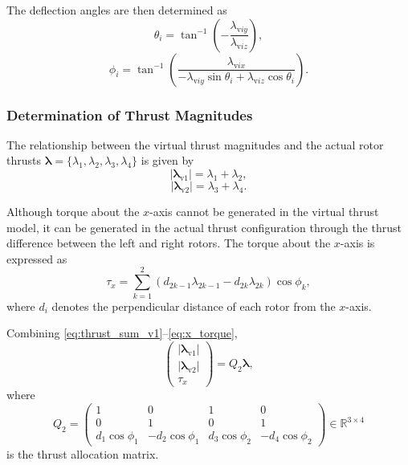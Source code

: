 \documentclass{WileyMSP-template}
\begin{document}
The deflection angles are then determined as
\begin{equation}
  \theta_i = \tan^{-1}\!\left( -\frac{\lambda_{\mathrm{v}iy}}{\lambda_{\mathrm{v}iz}} \right),
\end{equation}
\begin{equation}
  \phi_i = \tan^{-1}\!\left(
  \frac{\lambda_{\mathrm{v}ix}}
  {-\lambda_{\mathrm{v}iy}\sin\theta_i + \lambda_{\mathrm{v}iz}\cos\theta_i}
  \right).
\end{equation}

\subsubsection{Determination of Thrust Magnitudes}

The relationship between the virtual thrust magnitudes and the actual rotor thrusts $\bm{\lambda} = \{\lambda_1, \lambda_2, \lambda_3, \lambda_4\}$ is given by
\begin{equation}\label{eq:thrust_sum_v1}
  \lvert \bm{\lambda}_{\mathrm{v}1} \rvert = \lambda_1 + \lambda_2,
\end{equation}
\begin{equation}\label{eq:thrust_sum_v2}
  \lvert \bm{\lambda}_{\mathrm{v}2} \rvert = \lambda_3 + \lambda_4.
\end{equation}

Although torque about the $x$-axis cannot be generated in the virtual thrust model, it can be generated in the actual thrust configuration through the thrust difference between the left and right rotors. 
The torque about the $x$-axis is expressed as
\begin{equation}\label{eq:x_torque}
  \tau_x
  =
  \sum_{k=1}^{2}
  \left(
  d_{2k-1}\lambda_{2k-1}
  -
  d_{2k}\lambda_{2k}
  \right)
  \cos\phi_k,
\end{equation}
where $d_i$ denotes the perpendicular distance of each rotor from the $x$-axis.

Combining \eqref{eq:thrust_sum_v1}–\eqref{eq:x_torque},
\begin{equation}
  \begin{pmatrix}
  \lvert \bm{\lambda}_{\mathrm{v}1} \rvert \\
  \lvert \bm{\lambda}_{\mathrm{v}2} \rvert \\
  \tau_x
  \end{pmatrix}
  =
  Q_2 \bm{\lambda},
\end{equation}
where
\begin{equation}
  Q_2 =
  \begin{pmatrix}
  1 & 0 & 1 & 0 \\
  0 & 1 & 0 & 1 \\
  d_1\cos\phi_1 & -d_2\cos\phi_1 & d_3\cos\phi_2 & -d_4\cos\phi_2
  \end{pmatrix}
  \in \mathbb{R}^{3 \times 4}
\end{equation}
is the thrust allocation matrix.
\end{document}
